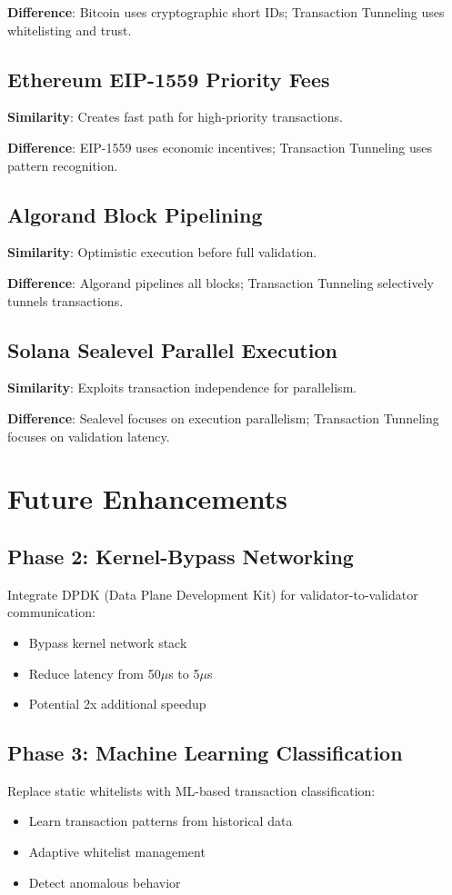 \documentclass[11pt,a4paper]{article}
\begin{document}
\textbf{Difference}: Bitcoin uses cryptographic short IDs; Transaction Tunneling uses whitelisting and trust.

\subsection{Ethereum EIP-1559 Priority Fees}
\textbf{Similarity}: Creates fast path for high-priority transactions.

\textbf{Difference}: EIP-1559 uses economic incentives; Transaction Tunneling uses pattern recognition.

\subsection{Algorand Block Pipelining}
\textbf{Similarity}: Optimistic execution before full validation.

\textbf{Difference}: Algorand pipelines all blocks; Transaction Tunneling selectively tunnels transactions.

\subsection{Solana Sealevel Parallel Execution}
\textbf{Similarity}: Exploits transaction independence for parallelism.

\textbf{Difference}: Sealevel focuses on execution parallelism; Transaction Tunneling focuses on validation latency.

\section{Future Enhancements}

\subsection{Phase 2: Kernel-Bypass Networking}
Integrate DPDK (Data Plane Development Kit) for validator-to-validator communication:
\begin{itemize}
    \item Bypass kernel network stack
    \item Reduce latency from 50$\mu$s to 5$\mu$s
    \item Potential 2x additional speedup
\end{itemize}

\subsection{Phase 3: Machine Learning Classification}
Replace static whitelists with ML-based transaction classification:
\begin{itemize}
    \item Learn transaction patterns from historical data
    \item Adaptive whitelist management
    \item Detect anomalous behavior
\end{itemize}
\end{document}
